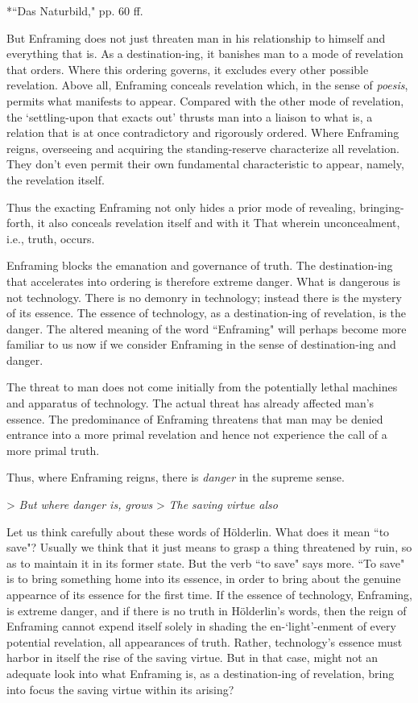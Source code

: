 \documentclass[12pt]{article}
\begin{document}
*``Das Naturbild," pp. 60 ff.

But Enframing does not just threaten man in his relationship to himself and everything that is. As a destination-ing, it banishes man to a mode of revelation that orders. Where this ordering governs, it excludes every other possible revelation. Above all, Enframing conceals revelation which, in the sense of \textit{p{\-o}esis}, permits what manifests to appear. Compared with the other mode of revelation, the `settling-upon that exacts out' thrusts man into a liaison to what is, a relation that is at once contradictory and rigorously ordered. Where Enframing reigns, overseeing and acquiring the standing-reserve characterize all revelation. They don't even permit their own fundamental characteristic to appear, namely, the revelation itself.

Thus the exacting Enframing not only hides a prior mode of revealing, bringing-forth, it also conceals revelation itself and with it That wherein unconcealment, i.e., truth, occurs.

Enframing blocks the emanation and governance of truth. The destination-ing that accelerates into ordering is therefore extreme danger. What is dangerous is not technology. There is no demonry in technology; instead there is the mystery of its essence. The essence of technology, as a destination-ing of revelation, is the danger. The altered meaning of the word ``Enframing" will perhaps become more familiar to us now if we consider Enframing in the sense of destination-ing and danger.

The threat to man does not come initially from the potentially lethal machines and apparatus of technology. The actual threat has already affected man's essence. The predominance of Enframing threatens that man may be denied entrance into a more primal revelation and hence not experience the call of a more primal truth.

Thus, where Enframing reigns, there is \textit{danger} in the supreme sense.

> \textit{But where danger is, grows}
> \textit{The saving virtue also}

Let us think carefully about these words of H{\"o}lderlin. What does it mean ``to save"? Usually we think that it just means to grasp a thing threatened by ruin, so as to maintain it in its former state. But the verb ``to save" says more. ``To save" is to bring something home into its essence, in order to bring about the genuine appearnce of its essence for the first time. If the essence of technology, Enframing, is extreme danger, and if there is no truth in H{\"o}lderlin's words, then the reign of Enframing cannot expend itself solely in shading the en-`light'-enment of every potential revelation, all appearances of truth. Rather, technology's essence must harbor in itself the rise of the saving virtue. But in that case, might not an adequate look into what Enframing is, as a destination-ing of revelation, bring into focus the saving virtue within its arising? 
\end{document}
